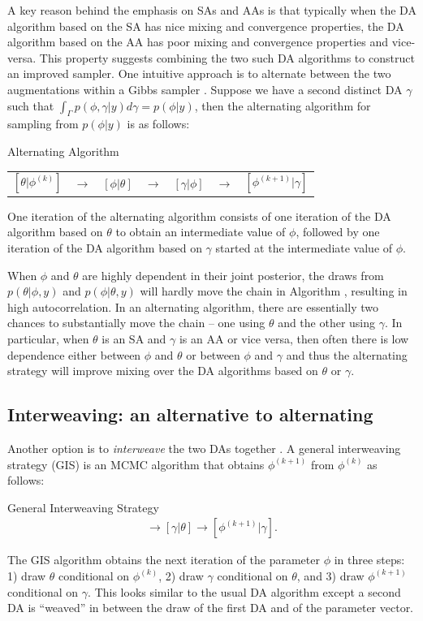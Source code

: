 \documentclass[12pt]{article}
\begin{document}
A key reason behind the emphasis on SAs and AAs is that typically when the DA algorithm based on the SA has nice mixing and convergence properties, the DA algorithm based on the AA has poor mixing and convergence properties and vice-versa. This property suggests combining the two such DA algorithms to construct an improved sampler. One intuitive approach is to alternate between the two augmentations within a Gibbs sampler \citep{papaspiliopoulos2007general}. Suppose we have a second distinct DA $\gamma$ such that $\int_\Gamma p(\phi,\gamma|y)d\gamma = p(\phi|y)$, then the alternating algorithm for sampling from $p(\phi|y)$ is as follows:
\begin{alg*}[Alt]Alternating Algorithm\label{alg:Alt}
  \begin{center}
    \begin{tabular}{lllllll}
  $[\theta|\phi^{(k)}]$& $\to$& $[\phi|\theta]$& $\to$& $[\gamma|\phi]$& $\to$& $[\phi^{(k+1)}|\gamma]$
    \end{tabular}
  \end{center}
\end{alg*}
\noindent One iteration of the alternating algorithm consists of one iteration of the DA algorithm based on $\theta$ to obtain an intermediate value of $\phi$, followed by one iteration of the DA algorithm based on $\gamma$ started at the intermediate value of $\phi$.

When $\phi$ and $\theta$ are highly dependent in their joint posterior, the draws from $p(\theta|\phi,y)$ and $p(\phi|\theta,y)$ will hardly move the chain in Algorithm , resulting in high autocorrelation. In an alternating algorithm, there are essentially two chances to substantially move the chain -- one using $\theta$ and the other using $\gamma$. In particular, when $\theta$ is an SA and $\gamma$ is an AA or vice versa, then often there is low dependence either between $\phi$ and $\theta$ or between $\phi$ and $\gamma$ and thus the alternating strategy will improve mixing over the DA algorithms based on $\theta$ or $\gamma$.

\subsection{Interweaving: an alternative to alternating}\label{sec:Intro:int}

Another option is to {\it interweave} the two DAs together \citep{yu2011center}. A general interweaving strategy (GIS) is an MCMC algorithm that obtains $\phi^{(k+1)}$ from $\phi^{(k)}$ as follows:
\begin{alg*}[GIS]General Interweaving Strategy\label{alg:GIS}
  \begin{align*}
    [\theta|\phi^{(k)}] \to [\gamma|\theta] \to [\phi^{(k+1)}|\gamma].
  \end{align*}
\end{alg*}
\noindent The GIS algorithm obtains the next iteration of the parameter $\phi$ in three steps: 1) draw $\theta$ conditional on $\phi^{(k)}$, 2) draw $\gamma$ conditional on $\theta$, and 3) draw $\phi^{(k+1)}$ conditional on $\gamma$. This looks similar to the usual DA algorithm except a second DA is ``weaved'' in between the draw of the first DA and of the parameter vector. 
\end{document}
